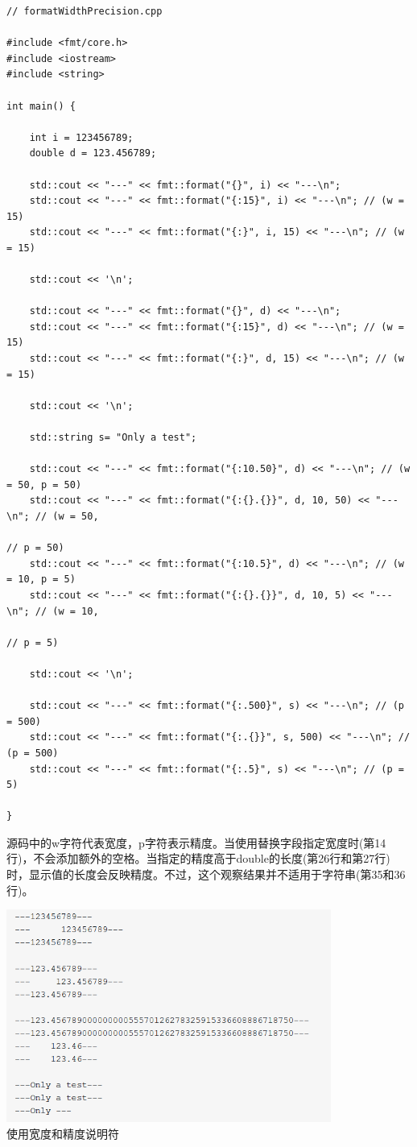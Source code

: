 \begin{lstlisting}[style=styleCXX]
// formatWidthPrecision.cpp

#include <fmt/core.h>
#include <iostream>
#include <string>

int main() {

	int i = 123456789;
	double d = 123.456789;
	
	std::cout << "---" << fmt::format("{}", i) << "---\n";
	std::cout << "---" << fmt::format("{:15}", i) << "---\n"; // (w = 15)
	std::cout << "---" << fmt::format("{:}", i, 15) << "---\n"; // (w = 15)
	
	std::cout << '\n';
	
	std::cout << "---" << fmt::format("{}", d) << "---\n";
	std::cout << "---" << fmt::format("{:15}", d) << "---\n"; // (w = 15)
	std::cout << "---" << fmt::format("{:}", d, 15) << "---\n"; // (w = 15)
	
	std::cout << '\n';
	
	std::string s= "Only a test";
	
	std::cout << "---" << fmt::format("{:10.50}", d) << "---\n"; // (w = 50, p = 50)
	std::cout << "---" << fmt::format("{:{}.{}}", d, 10, 50) << "---\n"; // (w = 50,
	                                                                     // p = 50)
	std::cout << "---" << fmt::format("{:10.5}", d) << "---\n"; // (w = 10, p = 5)
	std::cout << "---" << fmt::format("{:{}.{}}", d, 10, 5) << "---\n"; // (w = 10, 
	                                                                    // p = 5)
	
	std::cout << '\n';
	
	std::cout << "---" << fmt::format("{:.500}", s) << "---\n"; // (p = 500)
	std::cout << "---" << fmt::format("{:.{}}", s, 500) << "---\n"; // (p = 500)
	std::cout << "---" << fmt::format("{:.5}", s) << "---\n"; // (p = 5)

}
\end{lstlisting}

源码中的w字符代表宽度，p字符表示精度。当使用替换字段指定宽度时(第14行)，不会添加额外的空格。当指定的精度高于double的长度(第26行和第27行)时，显示值的长度会反映精度。不过，这个观察结果并不适用于字符串(第35和36行)。

\begin{center}
\includegraphics[width=0.8\textwidth]{content/3/chapter5/images/30.png}\\
使用宽度和精度说明符
\end{center}


